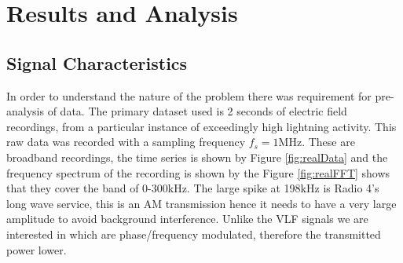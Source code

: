 \chapter{Results and Analysis}
\section{Signal Characteristics}\label{sec:sigChar}
In order to understand the nature of the problem there was requirement for pre-analysis of data. The primary dataset used is 2 seconds of electric field recordings, from a particular instance of exceedingly high lightning activity. This raw data was recorded with a sampling frequency $f_s = 1\si{\mega\hertz}$. These are broadband recordings, the time series is shown by Figure \ref{fig:realData} and the frequency spectrum of the recording is shown by the Figure \ref{fig:realFFT} shows that they cover the band of 0-300\si{\kilo\hertz}. The large spike at 198kHz is Radio 4's long wave service, this is an AM transmission hence it needs to have a very large amplitude to avoid background interference. Unlike the VLF signals we are interested in which are phase/frequency modulated, therefore the transmitted power lower.


